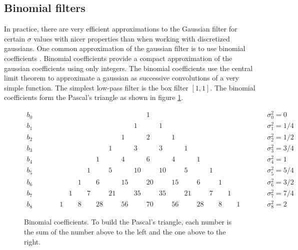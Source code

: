 \subsection{Binomial filters}

In practice, there are very efficient approximations to the Gaussian filter for certain $\sigma$ values with nicer properties than when working with discretized gaussians. One common approximation of the gaussian filter is to use binomial coefficients \cite{canny,Chehikian}. Binomial coefficients provide a compact approximation of the gaussian coefficients using only integers. The binomial coefficients use the central limit theorem to approximate a gaussian as successive convolutions of a very simple function. The simplest low-pass filter is the box filter $\left[1,1\right]$. The binomial coefficients form the Pascal's triangle as shown in figure \ref{fig:pascaltriangle}.

\begin{figure}[h]
	\centerline{
		$\begin{array}{ccccccccccccccccccccccccl}
				b_0 & ~ & ~ & ~ & ~ & ~ & ~ & ~ & ~  & ~  & ~  & ~  & 1  & ~  & ~  & ~  & ~  & ~ & ~ & ~ & ~ & ~ & ~ & ~ & \sigma_0^2=0   \\
				b_1 & ~ & ~ & ~ & ~ & ~ & ~ & ~ & ~  & ~  & ~  & 1  & ~  & 1  & ~  & ~  & ~  & ~ & ~ & ~ & ~ & ~ & ~ & ~ & \sigma_1^2=1/4 \\
				b_2 & ~ & ~ & ~ & ~ & ~ & ~ & ~ & ~  & ~  & 1  & ~  & 2  & ~  & 1  & ~  & ~  & ~ & ~ & ~ & ~ & ~ & ~ & ~ & \sigma_2^2=1/2 \\
				b_3 & ~ & ~ & ~ & ~ & ~ & ~ & ~ & ~  & 1  & ~  & 3  & ~  & 3  & ~  & 1  & ~  & ~ & ~ & ~ & ~ & ~ & ~ & ~ & \sigma_3^2=3/4 \\
				b_4 & ~ & ~ & ~ & ~ & ~ & ~ & ~ & 1  & ~  & 4  & ~  & 6  & ~  & 4  & ~  & 1  & ~ & ~ & ~ & ~ & ~ & ~ & ~ & \sigma_4^2=1   \\
				b_5 & ~ & ~ & ~ & ~ & ~ & ~ & 1 & ~  & 5  & ~  & 10 & ~  & 10 & ~  & 5  & ~  & 1 & ~ & ~ & ~ & ~ & ~ & ~ & \sigma_5^2=5/4 \\
				b_6 & ~ & ~ & ~ & ~ & ~ & 1 & ~ & 6  & ~  & 15 & ~  & 20 & ~  & 15 & ~  & 6  & ~ & 1 & ~ & ~ & ~ & ~ & ~ & \sigma_6^2=3/2 \\
				b_7 & ~ & ~ & ~ & ~ & 1 & ~ & 7 & ~  & 21 & ~  & 35 & ~  & 35 & ~  & 21 & ~  & 7 & ~ & 1 & ~ & ~ & ~ & ~ & \sigma_7^2=7/4 \\
				b_8 & ~ & ~ & ~ & 1 & ~ & 8 & ~ & 28 & ~  & 56 & ~  & 70 & ~  & 56 & ~  & 28 & ~ & 8 & ~ & 1 & ~ & ~ & ~ & \sigma_8^2=2
			\end{array}$
	}
	\caption{Binomial coefficients. To build the Pascal's triangle, each number is the sum of the number above to the left and the one above to the right.}
	\label{fig:pascaltriangle}
\end{figure}

